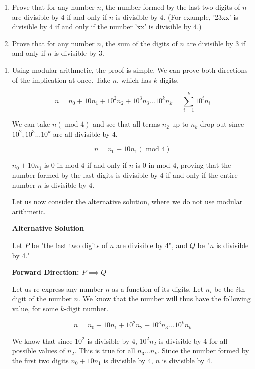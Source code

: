 
\begin{enumerate}
\item Prove that for any number $n$, the number formed by the last two digits of $n$ are divisible by 4 if and only if $n$ is divisible by 4. (For example, '23xx' is divisible by 4 if and only if the number 'xx' is divisible by 4.)
\item Prove that for any number $n$, the sum of the digits of $n$ are divisible by 3 if and only if $n$ is divisible by 3.
\end{enumerate}

\begin{solution}

\begin{enumerate}
\item Using modular arithmetic, the proof is simple. We can prove both directions
of the implication at once. Take $n$, which has $k$ digits.

$$n = n_0 + 10 n_1 + 10^2 n_2 + 10^3 n_3 \dots 10^k n_k = \sum_{i=1}^k 10^i n_i$$

We can take $n (\text{ mod } 4)$ and see that all terms $n_2$ up to $n_k$ drop
out since $10^2, 10^3 \dots 10^k$ are all divisible by 4.

$$n = n_0 + 10 n_1 (\text{ mod } 4)$$

$n_0 + 10n_1$ is 0 in mod 4 if and only if $n$ is 0 in mod 4, proving that
the number formed by the last digits is divisible by 4 if and only if
the entire number $n$ is divisible by 4.

Let us now consider the alternative solution, where we do not use modular
arithmetic.

\textbf{Alternative Solution}

Let $P$ be "the last two digits of $n$ are divisible by 4", and $Q$ be
"$n$ is divisible by 4."

\textbf{Forward Direction: $P \implies Q$}

Let us re-express any number $n$ as a function of its digits. Let $n_i$
be the $i$th digit of the number $n$. We know that the number will thus have
the following value, for some $k$-digit number.

$$n = n_0 + 10 n_1 + 10^2 n_2 + 10^3 n_3 \dots 10^k n_k$$

We know that since $10^2$ is divisible by 4, $10^2 n_2$ is divisible by 4 for all
possible values of $n_2$. This is true for all $n_3 \dots n_k$. Since the number
formed by the first two digits $n_0 + 10n_1$ is divisible by 4, $n$ is
divisible by 4.


\end{enumerate}
\end{solution}
